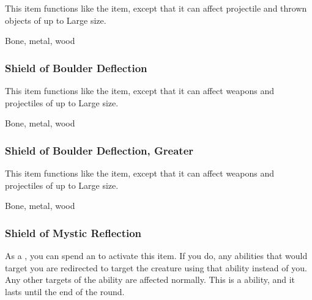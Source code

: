 This item functions like the  item, except that it can affect projectile and thrown objects of up to Large size.



 Bone, metal, wood


\lowercase{\hypertarget{item:Shield of Boulder Deflection}{}}\label{item:Shield of Boulder Deflection}
\hypertarget{item:Shield of Boulder Deflection}{\subsubsection{Shield of Boulder Deflection\hfill{}}}

This item functions like the  item, except that it can affect weapons and projectiles of up to Large size.



 Bone, metal, wood


\lowercase{\hypertarget{item:Shield of Boulder Deflection, Greater}{}}\label{item:Shield of Boulder Deflection, Greater}
\hypertarget{item:Shield of Boulder Deflection, Greater}{\subsubsection{Shield of Boulder Deflection, Greater\hfill{}}}

This item functions like the  item, except that it can affect weapons and projectiles of up to Large size.



 Bone, metal, wood


\lowercase{\hypertarget{item:Shield of Mystic Reflection}{}}\label{item:Shield of Mystic Reflection}
\hypertarget{item:Shield of Mystic Reflection}{\subsubsection{Shield of Mystic Reflection\hfill{}}}

As a , you can spend an  to activate this item.
If you do, any   abilities that would target you are redirected to target the creature using that ability instead of you.
Any other targets of the ability are affected normally.
This is a  ability, and it lasts until the end of the round.



